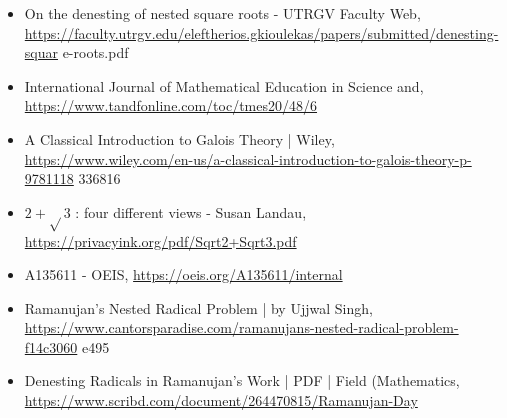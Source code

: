 \documentclass[10pt]{article}
\begin{document}
\begin{itemize}
  \item[11.] On the denesting of nested square roots - UTRGV Faculty Web, \href{https://faculty.utrgv.edu/eleftherios.gkioulekas/papers/submitted/denesting-squar}{https://faculty.utrgv.edu/eleftherios.gkioulekas/papers/submitted/denesting-squar} e-roots.pdf
  \item[12.] International Journal of Mathematical Education in Science and, \href{https://www.tandfonline.com/toc/tmes20/48/6}{https://www.tandfonline.com/toc/tmes20/48/6}
  \item[13.] A Classical Introduction to Galois Theory | Wiley, \href{https://www.wiley.com/en-us/a-classical-introduction-to-galois-theory-p-9781118}{https://www.wiley.com/en-us/a-classical-introduction-to-galois-theory-p-9781118} 336816
  \item[14.] $2+\sqrt{ } 3$ : four different views - Susan Landau, \href{https://privacyink.org/pdf/Sqrt2+Sqrt3.pdf}{https://privacyink.org/pdf/Sqrt2+Sqrt3.pdf}
  \item[15.] A135611 - OEIS, \href{https://oeis.org/A135611/internal}{https://oeis.org/A135611/internal}
  \item[16.] Ramanujan's Nested Radical Problem | by Ujjwal Singh, \href{https://www.cantorsparadise.com/ramanujans-nested-radical-problem-f14c3060}{https://www.cantorsparadise.com/ramanujans-nested-radical-problem-f14c3060} e495
  \item[17.] Denesting Radicals in Ramanujan's Work | PDF | Field (Mathematics, \href{https://www.scribd.com/document/264470815/Ramanujan-Day}{https://www.scribd.com/document/264470815/Ramanujan-Day}
\end{itemize}
\end{document}
